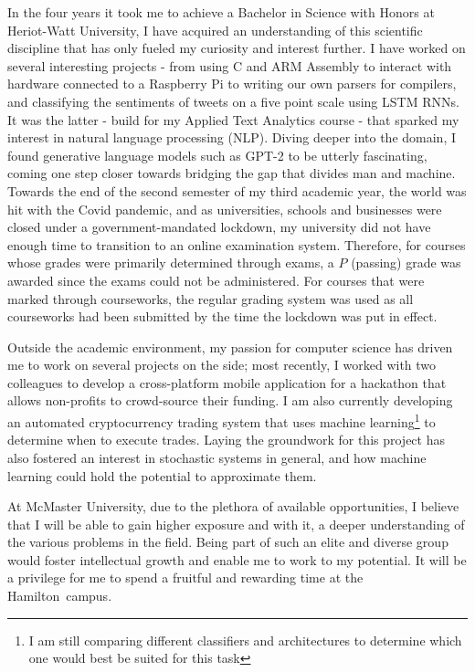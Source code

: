 \documentclass[a4paper,11pt]{article}
\newcommand{\uni}{McMaster University}
\newcommand{\city}{Hamilton}
\newcommand{\hw}{Heriot-Watt University}
\begin{document}
In the four years it took me to achieve a Bachelor in Science with Honors at \hw, I have acquired an understanding of this scientific discipline that has only fueled my curiosity and interest further. I have worked on several interesting projects - from using C and ARM Assembly to interact with hardware connected to a Raspberry Pi to writing our own parsers for compilers, and classifying the sentiments of tweets on a five point scale using LSTM RNNs. It was the latter - build for my Applied Text Analytics course - that sparked my interest in natural language processing (NLP). Diving deeper into the domain, I found generative language models such as GPT-2 to be utterly fascinating, coming one step closer towards bridging the gap that divides man and machine.
Towards the end of the second semester of my third academic year, the world was hit with the Covid pandemic, and as universities, schools and businesses were closed under a government-mandated lockdown, my university did not have enough time to transition to an online examination system. Therefore, for courses whose grades were primarily determined through exams, a $P$ (passing) grade was awarded since the exams could not be administered. For courses that were marked through courseworks, the regular grading system was used as all courseworks had been submitted by the time the lockdown was put in effect.

Outside the academic environment, my passion for computer science has driven me to work on several projects on the side; most recently, I worked with two colleagues to develop a cross-platform mobile application for a hackathon that allows non-profits to crowd-source their funding. I am also currently developing an automated cryptocurrency trading system that uses machine learning\footnote{I am still comparing different classifiers and architectures to determine which one would best be suited for this task} to determine when to execute trades. Laying the groundwork for this project has also fostered an interest in stochastic systems in general, and how machine learning could hold the potential to approximate them. 

At \uni, due to the plethora of available opportunities, I believe that I will be able to gain higher exposure and with it, a deeper understanding of the various problems in the field. Being part of such an elite and diverse group would foster intellectual growth and enable me to work to my potential. It will be a privilege for me to spend a fruitful and rewarding time at the \city\ campus.

\printbibliography
\end{document}
